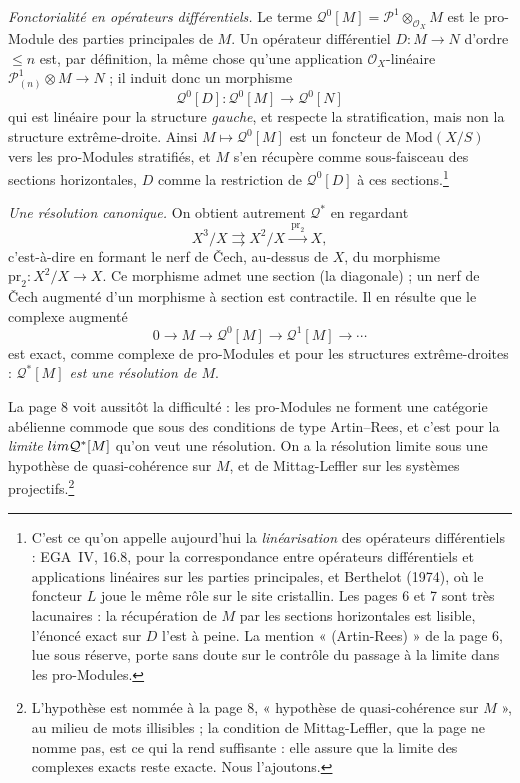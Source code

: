 \documentclass[11pt,a4paper]{article}
\begin{document}
\emph{Fonctorialité en opérateurs différentiels.} Le terme
$\mathcal{Q}^{0}[M] = \mathcal{P}^{1} \otimes_{\mathcal{O}_X} M$ est le
pro-Module des parties principales de $M$. Un opérateur différentiel
$D : M \to N$ d'ordre $\leq n$ est, par définition, la même chose qu'une
application $\mathcal{O}_X$-linéaire $\mathcal{P}^{1}_{(n)} \otimes M \to N$ ;
il induit donc un morphisme
\[
  \mathcal{Q}^{0}[D] : \mathcal{Q}^{0}[M] \longrightarrow \mathcal{Q}^{0}[N]
\]
qui est linéaire pour la structure \emph{gauche}, et respecte la
stratification, mais non la structure extrême-droite. Ainsi $M \mapsto
\mathcal{Q}^{0}[M]$ est un foncteur de $\mathrm{Mod}(X/S)$ vers les
pro-Modules stratifiés, et $M$ s'en récupère comme sous-faisceau des sections
horizontales, $D$ comme la restriction de $\mathcal{Q}^{0}[D]$ à ces
sections.\footnote{C'est ce qu'on appelle aujourd'hui la
\emph{linéarisation} des opérateurs différentiels : EGA~IV, 16.8, pour la
correspondance entre opérateurs différentiels et applications linéaires sur
les parties principales, et Berthelot (1974), où le foncteur $L$ joue le même
rôle sur le site cristallin. Les pages 6 et 7 sont très lacunaires : la
récupération de $M$ par les sections horizontales est lisible, l'énoncé
exact sur $D$ l'est à peine. La mention « (Artin-Rees) » de la page 6, lue
sous réserve, porte sans doute sur le contrôle du passage à la limite dans
les pro-Modules.}

\emph{Une résolution canonique.} On obtient autrement $\mathcal{Q}^{*}$ en
regardant
\[
  X^{3}/X \rightrightarrows X^{2}/X \xrightarrow{\ \mathrm{pr}_2\ } X ,
\]
c'est-à-dire en formant le nerf de Čech, au-dessus de $X$, du morphisme
$\mathrm{pr}_2 : X^{2}/X \to X$. Ce morphisme admet une section (la
diagonale) ; un nerf de Čech augmenté d'un morphisme à section est
contractile. Il en résulte que le complexe augmenté
\[
  0 \to M \to \mathcal{Q}^{0}[M] \to \mathcal{Q}^{1}[M] \to \cdots
\]
est exact, comme complexe de pro-Modules et pour les structures
extrême-droites : \emph{$\mathcal{Q}^{*}[M]$ est une résolution de $M$}.

La page 8 voit aussitôt la difficulté : les pro-Modules ne forment une
catégorie abélienne commode que sous des conditions de type Artin--Rees, et
c'est pour la \emph{limite} $\varprojlim \mathcal{Q}^{*}[M]$ qu'on veut une
résolution. On a la résolution limite sous une hypothèse de
quasi-cohérence sur $M$, et de Mittag-Leffler sur les systèmes
projectifs.\footnote{L'hypothèse est nommée à la page 8, « hypothèse de
quasi-cohérence sur $M$ », au milieu de mots illisibles ; la condition de
Mittag-Leffler, que la page ne nomme pas, est ce qui la rend suffisante :
elle assure que la limite des complexes exacts reste exacte. Nous
l'ajoutons.}
\end{document}
